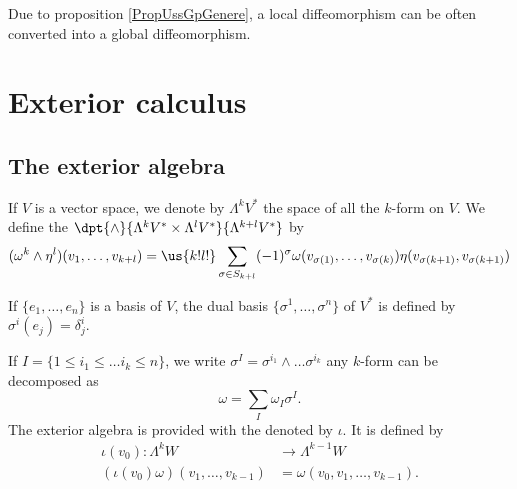 Due to proposition \ref{PropUssGpGenere}, a local diffeomorphism can be often converted into a global diffeomorphism.

\section{Exterior calculus}

\subsection{The exterior algebra}

\begin{definition}
	If $V$ is a vector space, we denote by $\Lambda^kV^*$ the space of all the $k$-form on $V$. We define the  $\dpt{\wedge}{\Lambda^kV^*\times\Lambda^lV^*}{\Lambda^{k+l}V^*}$ by
	\begin{equation}
		(\omega^k\wedge\eta^l)(v_1,\ldots,v_{k+l})
		=\us{k!l!}\sum_{\sigma\in S_{k+l}} (-1)^{\sigma}   \omega(v_{\sigma(1)},\ldots,v_{\sigma(k)})\eta(v_{\sigma(k+1)},v_{\sigma(k+1)})
	\end{equation}
\end{definition}
If $\{e_1,\ldots,e_n\}$ is a basis of $V$, the dual basis $\{\sigma^1,\ldots,\sigma^n\}$ of $V^*$ is defined by $\sigma^i(e_j)=\delta^i_j$.

If $I=\{1\leq i_1\leq\ldots i_k\leq n\}$, we write $\sigma^I=\sigma^{i_1}\wedge\ldots\sigma^{i_k}$ any $k$-form can be decomposed as
\[
	\omega=\sum_{I}\omega_I\sigma^I.
\]
The exterior algebra is provided with the  denoted by $\iota$. It is defined by\label{pg_DefProdExt}
\begin{equation}
	\begin{aligned}
		\iota(v_0)\colon\Lambda^kW             & \to \Lambda^{k-1}W               \\
		(\iota(v_0)\omega)(v_1,\ldots,v_{k-1}) & =\omega(v_0,v_1,\ldots,v_{k-1}).
	\end{aligned}
\end{equation}

